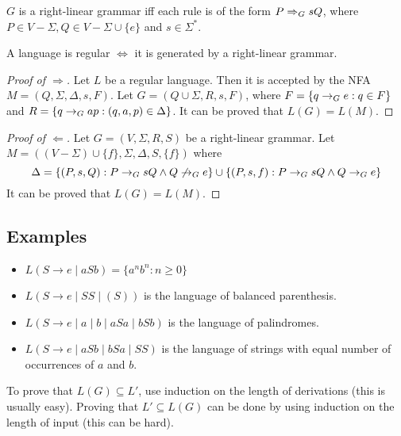\begin{definition}
$G$ is a right-linear grammar iff each rule is of the form $P \Rightarrow_{G} sQ$,
where $P \in V - \Sigma, Q \in V - \Sigma \cup \{e\}$ and $s \in \Sigma^*$.
\end{definition}
\begin{theorem}A language is regular $\iff$ it is generated by a right-linear grammar.\end{theorem}
\begin{proof}[Proof of $\Rightarrow$]
Let $L$ be a regular language. Then it is accepted by the NFA $M = (Q, \Sigma, \Delta, s, F)$.
Let $G = (Q \cup \Sigma, R, s, F)$, where $F = \{q \rightarrow_{G} e: q \in F\}$
and $R = \{q \rightarrow_{G} ap: (q, a, p) \in \Delta\}$.
It can be proved that $L(G) = L(M)$.
\end{proof}
\begin{proof}[Proof of $\Leftarrow$]
Let $G = (V, \Sigma, R, S)$ be a right-linear grammar.
Let $M = ((V-\Sigma) \cup \{f\}, \Sigma, \Delta, S, \{f\})$ where
\[ \Delta = \{(P, s, Q): P \rightarrow_{G} sQ \wedge Q \not\rightarrow_{G} e \}
\cup \{(P, s, f): P \rightarrow_{G} sQ \wedge Q \rightarrow_{G} e \} \]
It can be proved that $L(G) = L(M)$.
\end{proof}

\subsection{Examples}
\begin{itemize}
\item $L(S \rightarrow e \mid aSb) = \{a^nb^n: n \ge 0\}$
\item $L(S \rightarrow e \mid SS \mid (S))$ is the language of balanced parenthesis.
\item $L(S \rightarrow e \mid a \mid b \mid aSa \mid bSb)$ is the language of palindromes.
\item $L(S \rightarrow e \mid aSb \mid bSa \mid SS)$ is the language of strings with
  equal number of occurrences of $a$ and $b$.
\end{itemize}

To prove that $L(G) \subseteq L'$, use induction on the length of derivations
(this is usually easy).
Proving that $L' \subseteq L(G)$ can be done by using induction on the length of input
(this can be hard).

